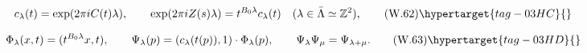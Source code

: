 \[
 c_{\lambda}(t)=\exp(2\pi iC(t)\lambda),
 \qquad
 \exp(2\pi iZ(s)\lambda)=t^{B_0\lambda}c_\lambda(t)
 \quad(\lambda\in\bar\Lambda\simeq\mathbb Z^2),
\tag{W.62}\hypertarget{tag-03HC}{}\label{wbII:eq:W:5.17u}
\]

\[
 \Phi_\lambda(x,t)=(t^{B_0\lambda}x,t),
 \qquad
 \Psi_\lambda(p)=(c_\lambda(t(p)),1)\cdot\Phi_\lambda(p),
 \qquad
 \Psi_\lambda\Psi_\mu=\Psi_{\lambda+\mu}.
\tag{W.63}\hypertarget{tag-03HD}{}\label{wbII:eq:W:5.17v}
\]

